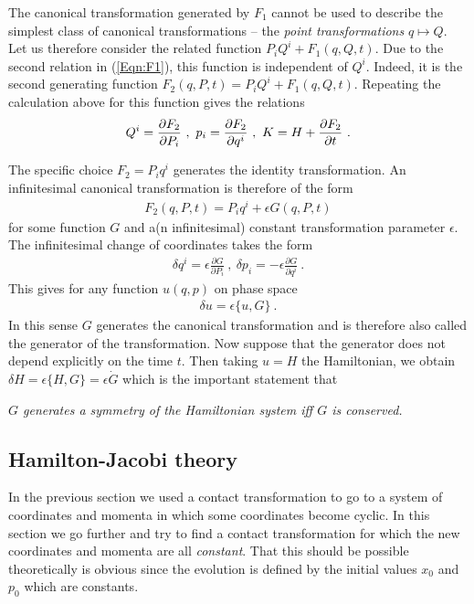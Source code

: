 \documentclass[12pt]{article}
\begin{document}
The canonical transformation generated by $F_1$ cannot be used to describe the simplest class of canonical transformations -- the {\em point transformations} $q\mapsto Q$. Let us therefore consider the related function $P_i Q^i+F_1(q, Q, t)$. Due to the second relation in (\ref{Eqn:F1}), this function is independent of $Q^i$. Indeed, it is the second generating function $F_2(q,P,t)=P_iQ^i+F_1(q,Q,t)$. Repeating the calculation above for this function gives the relations
\begin{eqnarray}
\label{Eqn:F2}
Q^i={\partial F_2\over \partial P_i}~,~p_i={\partial F_2\over \partial q^i}~,~K=H+{\partial F_2\over \partial t}~.
\end{eqnarray}

The specific choice $F_2=P_iq^i$ generates the identity transformation. An infinitesimal canonical transformation is therefore of the form
\begin{eqnarray}
F_2(q,P,t)=P_iq^i+\epsilon G(q,P,t)
\end{eqnarray}
for some function $G$ and a(n infinitesimal) constant transformation parameter $\epsilon$. The infinitesimal change of coordinates takes the form 
\begin{eqnarray}
\delta q^i=\epsilon \frac{\partial G}{\partial P_i}~,~\delta p_i=-\epsilon \frac{\partial G}{\partial q^i}~.
\end{eqnarray}
This gives for any function $u(q,p)$ on phase space 
\begin{eqnarray}
\delta u =\epsilon \{u ,G\}~.
\end{eqnarray}
In this sense $G$ generates the canonical transformation and is therefore also called the generator of the transformation. Now suppose that the generator does not depend explicitly on the time $t$. Then taking $u=H$ the Hamiltonian, we obtain $\delta H=\epsilon\{H, G\}=\epsilon \dot G$ which is the important statement that 

{\em $G$ generates a symmetry of the Hamiltonian system iff $G$ is conserved.}


\subsection{Hamilton-Jacobi theory}

In the previous section we used a contact transformation to go to a system of coordinates and momenta in which some coordinates become cyclic. In this section we go further and try to find a contact transformation for which the new coordinates and momenta are all {\em constant}. That this should be possible theoretically is obvious since the evolution is defined by the initial values $x_0$ and $p_0$ which are constants. 
\end{document}
